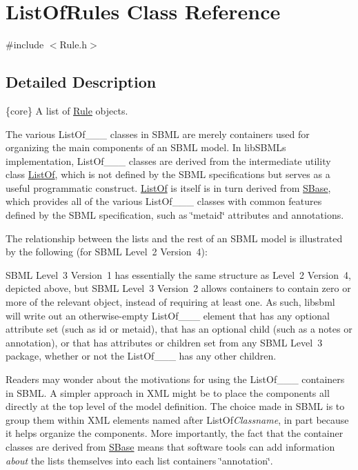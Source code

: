 \hypertarget{class_list_of_rules}{}\section{List\+Of\+Rules Class Reference}
\label{class_list_of_rules}


{\ttfamily \#include $<$Rule.\+h$>$}



\subsection{Detailed Description}
\{core\} A list of \hyperlink{class_rule}{Rule} objects.

\begin{DoxyParagraph}{}
The various List\+Of\+\_\+\+\_\+\+\_\+ classes in S\+B\+ML are merely containers used for organizing the main components of an S\+B\+ML model. In lib\+S\+B\+ML\textquotesingle{}s implementation, List\+Of\+\_\+\+\_\+\+\_\+ classes are derived from the intermediate utility class \hyperlink{class_list_of}{List\+Of}, which is not defined by the S\+B\+ML specifications but serves as a useful programmatic construct. \hyperlink{class_list_of}{List\+Of} is itself is in turn derived from \hyperlink{class_s_base}{S\+Base}, which provides all of the various List\+Of\+\_\+\+\_\+\+\_\+ classes with common features defined by the S\+B\+ML specification, such as \char`\"{}metaid\char`\"{} attributes and annotations.
\end{DoxyParagraph}
The relationship between the lists and the rest of an S\+B\+ML model is illustrated by the following (for S\+B\+ML Level~2 Version~4)\+:



S\+B\+ML Level~3 Version~1 has essentially the same structure as Level~2 Version~4, depicted above, but S\+B\+ML Level~3 Version~2 allows containers to contain zero or more of the relevant object, instead of requiring at least one. As such, libsbml will write out an otherwise-\/empty List\+Of\+\_\+\+\_\+\+\_\+ element that has any optional attribute set (such as \textquotesingle{}id\textquotesingle{} or \textquotesingle{}metaid\textquotesingle{}), that has an optional child (such as a \textquotesingle{}notes\textquotesingle{} or \textquotesingle{}annotation\textquotesingle{}), or that has attributes or children set from any S\+B\+ML Level~3 package, whether or not the List\+Of\+\_\+\+\_\+\+\_\+ has any other children.

Readers may wonder about the motivations for using the List\+Of\+\_\+\+\_\+\+\_\+ containers in S\+B\+ML. A simpler approach in X\+ML might be to place the components all directly at the top level of the model definition. The choice made in S\+B\+ML is to group them within X\+ML elements named after List\+Of{\itshape Classname}, in part because it helps organize the components. More importantly, the fact that the container classes are derived from \hyperlink{class_s_base}{S\+Base} means that software tools can add information {\itshape about} the lists themselves into each list container\textquotesingle{}s \char`\"{}annotation\char`\"{}.

